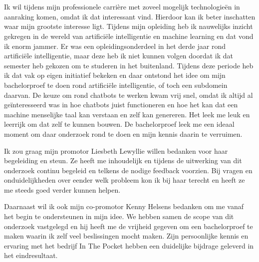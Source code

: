 
\chapter*{}
\label{ch:voorwoord}


Ik wil tijdens mijn professionele carrière met zoveel mogelijk technologieën in aanraking komen, omdat ik dat interessant vind. Hierdoor kan ik beter inschatten waar mijn grootste interesse ligt. Tijdens mijn opleiding heb ik nauwelijks inzicht gekregen in de wereld van artificiële intelligentie en machine learning en dat vond ik enorm jammer. Er was een opleidingsonderdeel in het derde jaar rond artificiële intelligentie, maar deze heb ik niet kunnen volgen doordat ik dat semester heb gekozen om te studeren in het buitenland. Tijdens deze periode heb ik dat vak op eigen initiatief bekeken en daar ontstond het idee om mijn bachelorproef te doen rond artificiële intelligentie, of toch een subdomein daarvan. De keuze om rond chatbots te werken kwam vrij snel, omdat ik altijd al geïnteresseerd was in hoe chatbots juist functioneren en hoe het kan dat een machine menselijke taal kan verstaan en zelf kan genereren. Het leek me leuk en leerrijk om dat zelf te kunnen bouwen. De bachelorproef leek me een ideaal moment om daar onderzoek rond te doen en mijn kennis daarin te verruimen.

Ik zou graag mijn promotor Liesbeth Lewyllie willen bedanken voor haar begeleiding en steun. Ze heeft me inhoudelijk en tijdens de uitwerking van dit onderzoek continu begeleid en telkens de nodige feedback voorzien. Bij vragen en onduidelijkheden over eender welk probleem kon ik bij haar terecht en heeft ze me steeds goed verder kunnen helpen.

Daarnaast wil ik ook mijn co-promotor Kenny Helsens bedanken om me vanaf het begin te ondersteunen in mijn idee. We hebben samen de scope van dit onderzoek vastgelegd en hij heeft me de vrijheid gegeven om een bachelorproef te maken waarin ik zelf veel beslissingen mocht maken. Zijn persoonlijke kennis en ervaring met het bedrijf In The Pocket hebben een duidelijke bijdrage geleverd in het eindresultaat.

